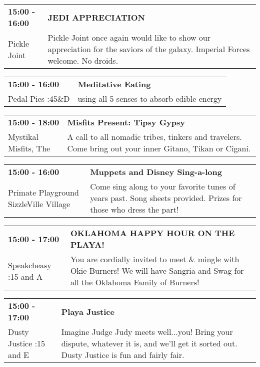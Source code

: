 \begin{tabular}{ p{1in} p{2.2in} }
    \textbf{15:00 - 16:00} & \textbf{JEDI APPRECIATION} \\
    Pickle Joint \newline  & Pickle Joint once again would like to show our appreciation for the saviors of the galaxy. Imperial Forces welcome. No droids. \\
    \hline 
\end{tabular}
    
\begin{tabular}{ p{1in} p{2.2in} }
    \textbf{15:00 - 16:00} & \textbf{Meditative Eating} \\
    Pedal Pies \newline 4:45\&D & using all 5 senses to absorb edible energy \\
    \hline 
\end{tabular}
    
\begin{tabular}{ p{1in} p{2.2in} }
    \textbf{15:00 - 18:00} & \textbf{Misfits Present: Tipsy Gypsy} \\
    Mystikal Misfits, The \newline  & A call to all nomadic tribes, tinkers and travelers. Come bring out your inner Gitano, Tikan or Cigani. \\
    \hline 
\end{tabular}
    
\begin{tabular}{ p{1in} p{2.2in} }
    \textbf{15:00 - 16:00} & \textbf{Muppets and Disney Sing-a-long} \\
    Primate Playground \newline SizzleVille Village & Come sing along to your favorite tunes of years past. Song sheets provided.  Prizes for those who dress the part! \\
    \hline 
\end{tabular}
    
\begin{tabular}{ p{1in} p{2.2in} }
    \textbf{15:00 - 17:00} & \textbf{OKLAHOMA HAPPY HOUR ON THE PLAYA!} \\
    Speakcheasy \newline 3:15 and A & You are cordially invited to meet \& mingle with Okie Burners!  We will have Sangria and Swag for all the Oklahoma Family of Burners! \\
    \hline 
\end{tabular}
    
\begin{tabular}{ p{1in} p{2.2in} }
    \textbf{15:00 - 17:00} & \textbf{Playa Justice} \\
    Dusty Justice \newline 6:15 and E & Imagine Judge Judy meets well...you! Bring your dispute, whatever it is, and we'll get it sorted out. Dusty Justice is fun and fairly fair. \\
    \hline 
\end{tabular}
    
